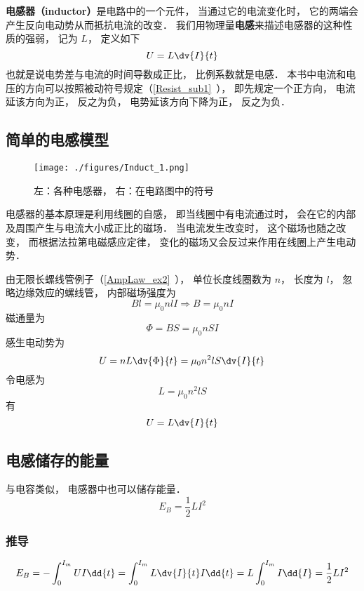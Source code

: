 
\begin{issues}
\issueAbstract
\end{issues}


\textbf{电感器（inductor）}是电路中的一个元件， 当通过它的电流变化时， 它的两端会产生反向电动势从而抵抗电流的改变． 我们用物理量\textbf{电感}来描述电感器的这种性质的强弱， 记为 $L$， 定义如下
\begin{equation}\label{Induct_eq3}
U = L\dv{I}{t}
\end{equation}
也就是说电势差与电流的时间导数成正比， 比例系数就是电感． 本书中电流和电压的方向可以按照被动符号规定（\autoref{Resist_sub1}~）， 即先规定一个正方向， 电流延该方向为正， 反之为负， 电势延该方向下降为正， 反之为负．

\subsection{简单的电感模型}

\begin{figure}[ht]
\centering
\texttt{[image: ./figures/Induct\_1.png]}
\caption{左：各种电感器， 右：在电路图中的符号} \label{Induct_fig1}
\end{figure}
电感器的基本原理是利用线圈的自感， 即当线圈中有电流通过时， 会在它的内部及周围产生与电流大小成正比的磁场． 当电流发生改变时， 这个磁场也随之改变， 而根据法拉第电磁感应定律， 变化的磁场又会反过来作用在线圈上产生电动势．

由无限长螺线管例子（\autoref{AmpLaw_ex2}~）， 单位长度线圈数为 $n$， 长度为 $l$， 忽略边缘效应的螺线管， 内部磁场强度为
\begin{equation}
Bl = \mu_0nlI \Rightarrow B = \mu_0nI
\end{equation}
磁通量为
\begin{equation}
\Phi = BS = \mu_0nSI
\end{equation}
感生电动势为
\begin{equation}
U = nL\dv{\Phi}{t} = \mu_0n^2lS \dv{I}{t}
\end{equation}
令电感为
\begin{equation}\label{Induct_eq1}
L = \mu_0n^2lS
\end{equation}
有
\begin{equation}\label{Induct_eq2}
U = L\dv{I}{t}
\end{equation}

\subsection{电感储存的能量}
与电容类似， 电感器中也可以储存能量．
\begin{equation}
E_B = \frac{1}{2}L I^2
\end{equation}

\subsubsection{推导}
\begin{equation}
E_B = -\int_0^{I_m} U I \dd{t} = \int_0^{I_m} L \dv{I}{t} I \dd{t} = L\int_0^{I_m} I \dd{I} = \frac{1}{2} L I^2
\end{equation}
